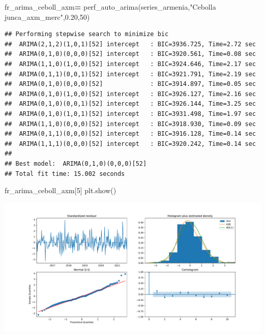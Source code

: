 \documentclass[
]{book}
\newenvironment{Shaded}{\begin{snugshade}}{\end{snugshade}}
\newcommand{\DecValTok}[1]{\textcolor[rgb]{0.00,0.00,0.81}{#1}}
\newcommand{\FloatTok}[1]{\textcolor[rgb]{0.00,0.00,0.81}{#1}}
\newcommand{\NormalTok}[1]{#1}
\newcommand{\OperatorTok}[1]{\textcolor[rgb]{0.81,0.36,0.00}{\textbf{#1}}}
\newcommand{\StringTok}[1]{\textcolor[rgb]{0.31,0.60,0.02}{#1}}
\begin{document}
\begin{Shaded}
\begin{Highlighting}[]

\NormalTok{fr\_arima\_ceboll\_axm}\OperatorTok{=}\NormalTok{ perf\_auto\_arima(series\_armenia,}\StringTok{"Cebolla junca\_axm\_merc"}\NormalTok{,}\FloatTok{0.20}\NormalTok{,}\DecValTok{50}\NormalTok{)}
\end{Highlighting}
\end{Shaded}

\begin{verbatim}
## Performing stepwise search to minimize bic
##  ARIMA(2,1,2)(1,0,1)[52] intercept   : BIC=3936.725, Time=2.72 sec
##  ARIMA(0,1,0)(0,0,0)[52] intercept   : BIC=3920.561, Time=0.08 sec
##  ARIMA(1,1,0)(1,0,0)[52] intercept   : BIC=3924.646, Time=2.17 sec
##  ARIMA(0,1,1)(0,0,1)[52] intercept   : BIC=3921.791, Time=2.19 sec
##  ARIMA(0,1,0)(0,0,0)[52]             : BIC=3914.897, Time=0.05 sec
##  ARIMA(0,1,0)(1,0,0)[52] intercept   : BIC=3926.127, Time=2.16 sec
##  ARIMA(0,1,0)(0,0,1)[52] intercept   : BIC=3926.144, Time=3.25 sec
##  ARIMA(0,1,0)(1,0,1)[52] intercept   : BIC=3931.498, Time=1.97 sec
##  ARIMA(1,1,0)(0,0,0)[52] intercept   : BIC=3918.930, Time=0.09 sec
##  ARIMA(0,1,1)(0,0,0)[52] intercept   : BIC=3916.128, Time=0.14 sec
##  ARIMA(1,1,1)(0,0,0)[52] intercept   : BIC=3920.242, Time=0.14 sec
## 
## Best model:  ARIMA(0,1,0)(0,0,0)[52]          
## Total fit time: 15.002 seconds
\end{verbatim}

\begin{Shaded}
\begin{Highlighting}[]
\NormalTok{fr\_arima\_ceboll\_axm[}\DecValTok{5}\NormalTok{]}
\NormalTok{plt.show()}
\end{Highlighting}
\end{Shaded}

\includegraphics{bookdown-demo_files/figure-latex/unnamed-chunk-151-139.pdf}
\end{document}
